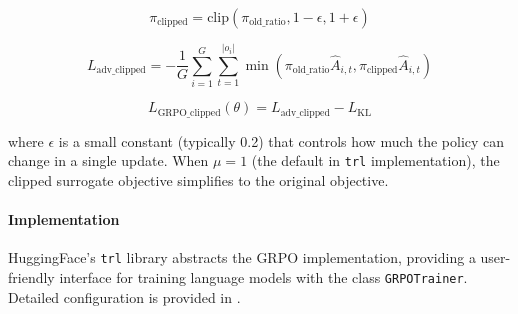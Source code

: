 \begin{equation}
\pi_\text{clipped} = \text{clip}(\pi_\text{old\_ratio}, 1-\epsilon, 1+\epsilon)
\end{equation}

\begin{equation}
L_{\text{adv\_clipped}} = -\frac{1}{G}\sum_{i=1}^{G}\sum_{t=1}^{|o_i|} \min(\pi_\text{old\_ratio}\hat{A}_{i,t}, \pi_\text{clipped}\hat{A}_{i,t})
\end{equation}

\begin{equation}
L_{\text{GRPO\_clipped}}(\theta) = L_{\text{adv\_clipped}} - L_{\text{KL}}
\end{equation}

where $\epsilon$ is a small constant (typically 0.2) that controls how much the policy can change in a single update. When $\mu = 1$ (the default in \verb|trl| implementation), the clipped surrogate objective simplifies to the original objective.

\paragraph{Implementation} HuggingFace's \verb|trl| library abstracts the GRPO implementation, providing a user-friendly interface for training language models with the class \verb|GRPOTrainer|. Detailed configuration is provided in .
